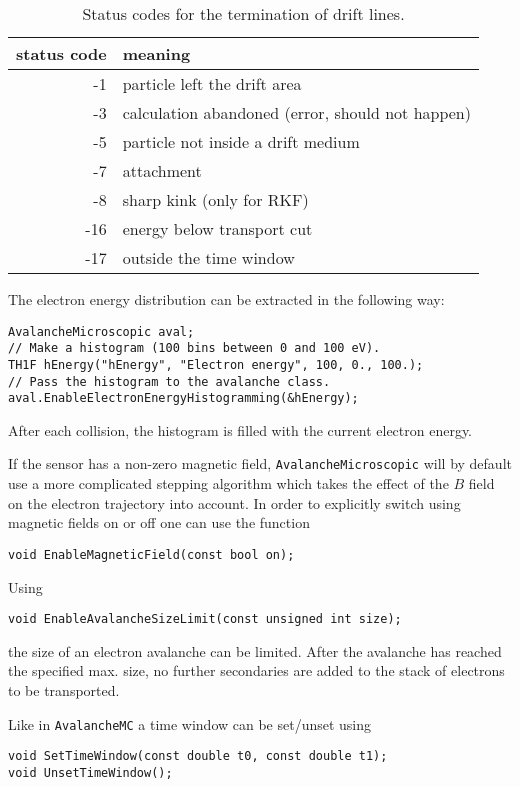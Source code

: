 \begin{table}
  \centering
  \caption{Status codes for the termination of drift lines.}
  \label{Tab:DriftLineStatusCodes}
  \begin{tabular}{r l}
    \toprule
    status code &  meaning\\
    \midrule
     -1 & particle left the drift area        \\
     -3 & calculation abandoned (error, should not happen) \\
     -5 & particle not inside a drift medium  \\
     -7 & attachment                          \\
     -8 & sharp kink (only for RKF)           \\
    -16 & energy below transport cut          \\
    -17 & outside the time window             \\
    \bottomrule
  \end{tabular}
\end{table}

The electron energy distribution can be extracted in the following way:
\begin{lstlisting}
AvalancheMicroscopic aval;
// Make a histogram (100 bins between 0 and 100 eV).
TH1F hEnergy("hEnergy", "Electron energy", 100, 0., 100.);
// Pass the histogram to the avalanche class.
aval.EnableElectronEnergyHistogramming(&hEnergy);
\end{lstlisting} 
After each collision, 
the histogram is filled with the current electron energy. 

If the sensor has a non-zero magnetic field, \texttt{AvalancheMicroscopic} 
will by default use a more complicated stepping algorithm which takes
the effect of the $B$ field on the electron trajectory into account.
In order to explicitly switch using magnetic fields on or off 
one can use the function
\begin{lstlisting}
void EnableMagneticField(const bool on);
\end{lstlisting}

Using 
\begin{lstlisting}
void EnableAvalancheSizeLimit(const unsigned int size);
\end{lstlisting}
the size of an electron avalanche can be limited. 
After the avalanche has reached the specified max. size, 
no further secondaries are added to the stack of electrons to be transported.  

Like in \texttt{AvalancheMC} a time window can be set/unset using
\begin{lstlisting}
void SetTimeWindow(const double t0, const double t1);
void UnsetTimeWindow();
\end{lstlisting}

